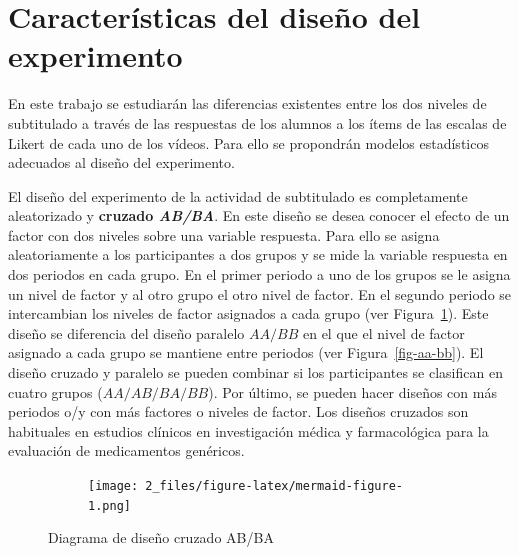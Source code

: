\documentclass[
  12pt,
  a4paper,
  extrafontsizes,
  onecolumn,
  openright,
  table]{memoir}
\begin{document}
\hypertarget{caracteruxedsticas-del-diseuxf1o-del-experimento}{%
\section{Características del diseño del
experimento}\label{caracteruxedsticas-del-diseuxf1o-del-experimento}}

En este trabajo se estudiarán las diferencias existentes entre los dos
niveles de subtitulado a través de las respuestas de los alumnos a los
ítems de las escalas de Likert de cada uno de los vídeos. Para ello se
propondrán modelos estadísticos adecuados al diseño del experimento.

El diseño del experimento de la actividad de subtitulado es
completamente aleatorizado y \textbf{cruzado \emph{AB/BA}}. En este
diseño se desea conocer el efecto de un factor con dos niveles sobre una
variable respuesta. Para ello se asigna aleatoriamente a los
participantes a dos grupos y se mide la variable respuesta en dos
periodos en cada grupo. En el primer periodo a uno de los grupos se le
asigna un nivel de factor y al otro grupo el otro nivel de factor. En el
segundo periodo se intercambian los niveles de factor asignados a cada
grupo (ver Figura~\ref{fig-ab-ba}). Este diseño se diferencia del diseño
paralelo \(AA/BB\) en el que el nivel de factor asignado a cada grupo se
mantiene entre periodos (ver Figura~\ref{fig-aa-bb}). El diseño cruzado
y paralelo se pueden combinar si los participantes se clasifican en
cuatro grupos (\(AA/AB/BA/BB\)). Por último, se pueden hacer diseños con
más periodos o/y con más factores o niveles de factor. Los diseños
cruzados son habituales en estudios clínicos en investigación médica
\autocite[ver][]{lim2021} y farmacológica para la evaluación de
medicamentos genéricos.

\begin{figure}

{\centering 

\begin{figure}[H]

{\centering \texttt{[image: 2\_files/figure-latex/mermaid-figure-1.png]}

}

\end{figure}

}

\caption{\label{fig-ab-ba}Diagrama de diseño cruzado AB/BA}

\end{figure}
\end{document}

